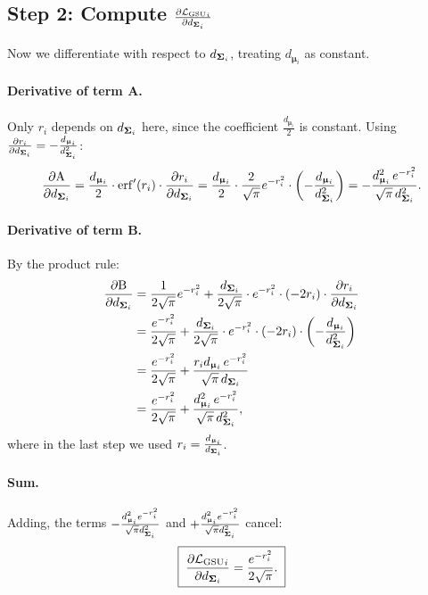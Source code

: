 \documentclass[11pt, letterpaper]{article}
\newcommand{\bSigma}{\vb{\Sigma}}
\newcommand{\bmu}{\boldsymbol{\upmu}}
\newcommand{\loss}{\mathcal{L}}
\begin{document}
\subsection{Step 2: Compute $\pdv{{\loss_{\text{GSU}}}_{i}}{d_{\bSigma_i}}$}

Now we differentiate with respect to $d_{\bSigma_i}$, treating $d_{\bmu_i}$ as constant.

\paragraph{Derivative of term A.} Only $r_i$ depends on $d_{\bSigma_i}$ here, since the coefficient $\frac{d_{\bmu_i}}{2}$ is constant. Using $\pdv{r_i}{d_{\bSigma_i}} = -\frac{d_{\bmu_i}}{d_{\bSigma_i}^2}$:
\begin{equation}
    \pdv{\text{A}}{d_{\bSigma_i}} = \frac{d_{\bmu_i}}{2} \cdot \mathrm{erf}'(r_i) \cdot \pdv{r_i}{d_{\bSigma_i}} = \frac{d_{\bmu_i}}{2}\cdot\frac{2}{\sqrt{\pi}}e^{-r_i^2}\cdot\left(-\frac{d_{\bmu_i}}{d_{\bSigma_i}^2}\right) = -\frac{d_{\bmu_i}^2\, e^{-r_i^2}}{\sqrt{\pi}\, d_{\bSigma_i}^2}.
\end{equation}

\paragraph{Derivative of term B.} By the product rule:
\begin{align}
    \pdv{\text{B}}{d_{\bSigma_i}} &= \frac{1}{2\sqrt{\pi}}e^{-r_i^2} + \frac{d_{\bSigma_i}}{2\sqrt{\pi}}\cdot e^{-r_i^2}\cdot(-2r_i)\cdot\pdv{r_i}{d_{\bSigma_i}} \notag \\
    &= \frac{e^{-r_i^2}}{2\sqrt{\pi}} + \frac{d_{\bSigma_i}}{2\sqrt{\pi}}\cdot e^{-r_i^2}\cdot(-2r_i)\cdot\left(-\frac{d_{\bmu_i}}{d_{\bSigma_i}^2}\right) \notag \\
    &= \frac{e^{-r_i^2}}{2\sqrt{\pi}} + \frac{r_i d_{\bmu_i}\, e^{-r_i^2}}{\sqrt{\pi}\, d_{\bSigma_i}} \notag \\
    &= \frac{e^{-r_i^2}}{2\sqrt{\pi}} + \frac{d_{\bmu_i}^2\, e^{-r_i^2}}{\sqrt{\pi}\, d_{\bSigma_i}^2},
\end{align}
where in the last step we used $r_i = \frac{d_{\bmu_i}}{d_{\bSigma_i}}$.

\paragraph{Sum.} Adding, the terms $-\frac{d_{\bmu_i}^2 e^{-r_i^2}}{\sqrt{\pi} d_{\bSigma_i}^2}$ and $+\frac{d_{\bmu_i}^2 e^{-r_i^2}}{\sqrt{\pi}d_{\bSigma_i}^2}$ cancel:
\begin{equation}\label{eq:dL_ddSigma}
    \boxed{\;\pdv{{\loss_{\text{GSU}}}_{i}}{d_{\bSigma_i}} = \frac{e^{-r_i^2}}{2\sqrt{\pi}}.\;}
\end{equation}
\end{document}
